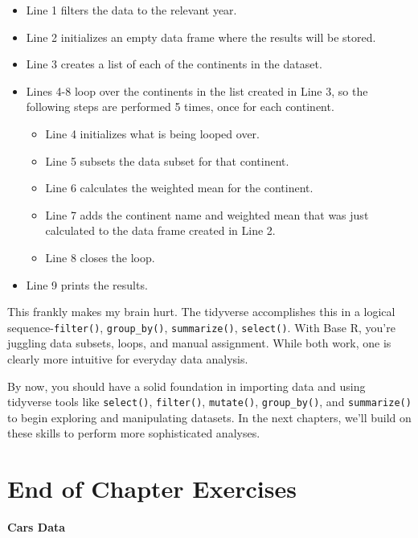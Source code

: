 \documentclass[
  letterpaper,
]{book}
\providecommand{\tightlist}{%
  \setlength{\itemsep}{0pt}\setlength{\parskip}{0pt}}\usepackage{longtable,booktabs,array}
\begin{document}
\begin{itemize}
\tightlist
\item
  Line 1 filters the data to the relevant year.
\item
  Line 2 initializes an empty data frame where the results will be
  stored.
\item
  Line 3 creates a list of each of the continents in the dataset.
\item
  Lines 4-8 loop over the continents in the list created in Line 3, so
  the following steps are performed 5 times, once for each continent.

  \begin{itemize}
  \tightlist
  \item
    Line 4 initializes what is being looped over.
  \item
    Line 5 subsets the data subset for that continent.
  \item
    Line 6 calculates the weighted mean for the continent.
  \item
    Line 7 adds the continent name and weighted mean that was just
    calculated to the data frame created in Line 2.
  \item
    Line 8 closes the loop.
  \end{itemize}
\item
  Line 9 prints the results.
\end{itemize}

This frankly makes my brain hurt. The tidyverse accomplishes this in a
logical sequence-\texttt{filter()}, \texttt{group\_by()},
\texttt{summarize()}, \texttt{select()}. With Base R, you're juggling
data subsets, loops, and manual assignment. While both work, one is
clearly more intuitive for everyday data analysis.

By now, you should have a solid foundation in importing data and using
tidyverse tools like \texttt{select()}, \texttt{filter()},
\texttt{mutate()}, \texttt{group\_by()}, and \texttt{summarize()} to
begin exploring and manipulating datasets. In the next chapters, we'll
build on these skills to perform more sophisticated analyses.

\section{End of Chapter Exercises}\label{end-of-chapter-exercises}

\textbf{Cars Data}
\end{document}
